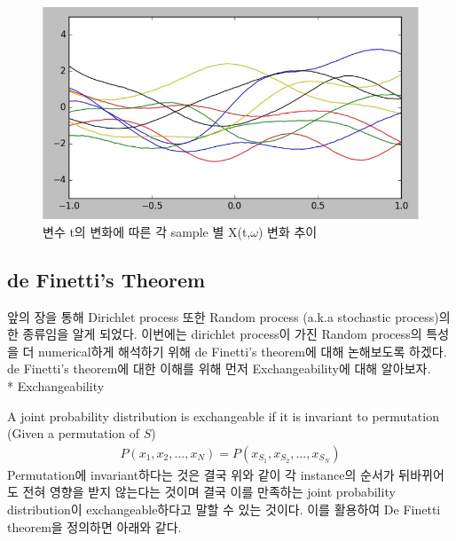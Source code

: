 \documentclass[a4paper]{oblivoir}
\begin{document}
\begin{figure}[ht] \centering 
\includegraphics[scale=0.5]{fig13_7.png} 
\caption{변수 t의 변화에 따른 각 sample 별 X(t,$\omega$) 변화 추이}
\label{fig:13-7}
\end{figure}

\subsection{de Finetti's Theorem}
앞의 장을 통해 Dirichlet process 또한 Random process (a.k.a stochastic process)의 한 종류임을 알게 되었다. 이번에는 dirichlet process이 가진 Random process의 특성을 더 numerical하게 해석하기 위해 de Finetti's theorem에 대해 논해보도록 하겠다. de Finetti's theorem에 대한 이해를 위해 먼저 Exchangeability에 대해 알아보자.\\

* Exchangeability

A joint probability distribution is exchangeable if it is invariant to permutation (Given a permutation of $S$)
\begin{eqnarray*}
    P(x_{1},x_{2},...,x_{N}) = P(x_{S_{1}},x_{S_{2}},...,x_{S_{N}})
\end{eqnarray*}
Permutation에 invariant하다는 것은 결국 위와 같이 각 instance의 순서가 뒤바뀌어도 전혀 영향을 받지 않는다는 것이며 결국 이를 만족하는 joint probability distribution이 exchangeable하다고 말할 수 있는 것이다. 이를 활용하여 De Finetti theorem을 정의하면 아래와 같다.\\
\end{document}
